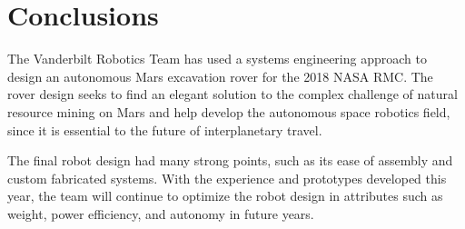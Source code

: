 \documentclass[class=article, crop=false]{standalone}
\begin{document}
	\section{Conclusions}
		The Vanderbilt Robotics Team has used a systems engineering approach to design an autonomous Mars excavation rover for the 2018 NASA RMC. The rover design seeks to find an elegant solution to the complex challenge of natural resource mining on Mars and help develop the autonomous space robotics field, since it is essential to the future of interplanetary travel. 
		
		The final robot design had many strong points, such as its ease of assembly and custom fabricated systems. With the experience and prototypes developed this year, the team will continue to optimize the robot design in attributes such as weight, power efficiency, and autonomy in future years.
\end{document}
